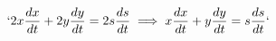 \documentclass[preview]{standalone}
\begin{document}
\begin{align*}
`2x \frac{dx}{dt} + 2y \frac{dy}{dt} = 2s \frac{ds}{dt} \implies x \frac{dx}{dt} + y \frac{dy}{dt} = s \frac{ds}{dt}`
\end{align*}
\end{document}
